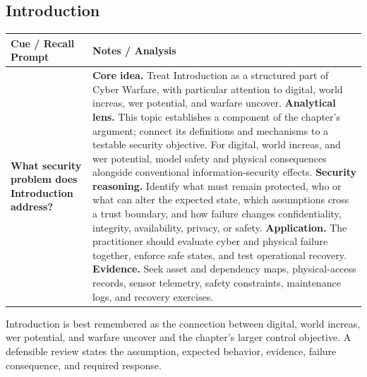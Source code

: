 \documentclass[11pt]{article}
\newcommand{\CornellHeader}{%
\rowcolor{Navy}\color{white}\bfseries Cue / Recall Prompt & \color{white}\bfseries Notes / Analysis\\\hline}
\newcommand{\CornellRow}[2]{%
\cellcolor{CueGray}\RaggedRight\textbf{#1} & \RaggedRight #2\\\hline}
\begin{document}
\subsection*{Introduction}
\begin{longtable}{>{\RaggedRight\arraybackslash}p{}|>{\RaggedRight\arraybackslash}p{}}
\CornellHeader
\CornellRow{What security problem does Introduction address?}{\textbf{Core idea.} Treat Introduction as a structured part of Cyber Warfare, with particular attention to digital, world increas, wer potential, and warfare uncover. \textbf{Analytical lens.} This topic establishes a component of the chapter's argument; connect its definitions and mechanisms to a testable security objective. For digital, world increas, and wer potential, model safety and physical consequences alongside conventional information-security effects. \textbf{Security reasoning.} Identify what must remain protected, who or what can alter the expected state, which assumptions cross a trust boundary, and how failure changes confidentiality, integrity, availability, privacy, or safety. \textbf{Application.} The practitioner should evaluate cyber and physical failure together, enforce safe states, and test operational recovery. \textbf{Evidence.} Seek asset and dependency maps, physical-access records, sensor telemetry, safety constraints, maintenance logs, and recovery exercises.}
\end{longtable}
\begin{topicsummary}
Introduction is best remembered as the connection between digital, world increas, wer potential, and warfare uncover and the chapter's larger control objective. A defensible review states the assumption, expected behavior, evidence, failure consequence, and required response.
\end{topicsummary}
\end{document}
